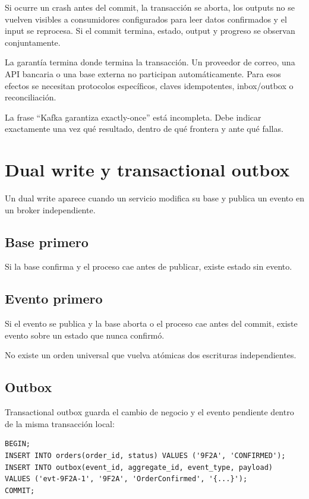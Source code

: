 \documentclass[variant=apuntes,cover=institutional,mode=screen]{ua-engineering-v6-article}
\begin{document}
Si ocurre un crash antes del commit, la transacción se aborta, los outputs no se vuelven visibles a consumidores configurados para leer datos confirmados y el input se reprocesa. Si el commit termina, estado, output y progreso se observan conjuntamente.

La garantía termina donde termina la transacción. Un proveedor de correo, una API bancaria o una base externa no participan automáticamente. Para esos efectos se necesitan protocolos específicos, claves idempotentes, inbox/outbox o reconciliación.

\begin{uawarn}
La frase ``Kafka garantiza exactly-once'' está incompleta. Debe indicar exactamente una vez qué resultado, dentro de qué frontera y ante qué fallas.
\end{uawarn}

\section{Dual write y transactional outbox}

Un dual write aparece cuando un servicio modifica su base y publica un evento en un broker independiente.

\subsection{Base primero}

Si la base confirma y el proceso cae antes de publicar, existe estado sin evento.

\subsection{Evento primero}

Si el evento se publica y la base aborta o el proceso cae antes del commit, existe evento sobre un estado que nunca confirmó.

No existe un orden universal que vuelva atómicas dos escrituras independientes.

\subsection{Outbox}

Transactional outbox guarda el cambio de negocio y el evento pendiente dentro de la misma transacción local:

\begin{verbatim}
BEGIN;
INSERT INTO orders(order_id, status) VALUES ('9F2A', 'CONFIRMED');
INSERT INTO outbox(event_id, aggregate_id, event_type, payload)
VALUES ('evt-9F2A-1', '9F2A', 'OrderConfirmed', '{...}');
COMMIT;
\end{verbatim}
\end{document}
